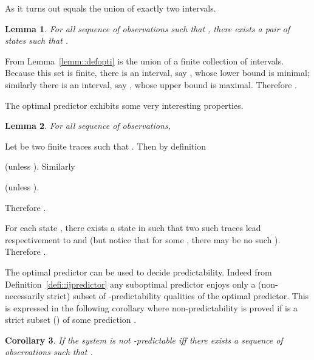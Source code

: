 \documentclass{article}
\newtheorem{lemm}{Lemma}
\newtheorem{coro}[lemm]{Corollary}
\newenvironment{proof}{\par\noindent{\bf Proof}}{\hspace{\stretch{1}}}
\begin{document}
As it turns out  equals the union of exactly two intervals.  

\begin{lemm}\label{lemm::twostates}
  For all sequence  of observations 
  such that , 
  there exists a pair of states  
  such that .  
\end{lemm}

\begin{proof}
  From Lemma~\ref{lemm::defopti} 
   is the union of a finite collection of intervals.  
  Because this set is finite, there is an interval, say , 
  whose lower bound is minimal; 
  similarly there is an interval, say , 
  whose upper bound is maximal.  
  Therefore .  
\end{proof}

The optimal predictor exhibits some very interesting properties.  

\begin{lemm}\label{lemm::onemoreobs}
  For all sequence  of observations, 
  
\end{lemm}

\begin{proof}
  Let  be two finite traces 
  such that .  
  Then by definition 
   
  (unless ).  
  Similarly 
   
  (unless ).  
  
  Therefore .  

  For each state , 
  there exists a state in  
  such that two such traces  
  lead respectivement to  and  
  (but notice that for some , there may be no such ).  
  Therefore .  
\end{proof}


The optimal predictor can be used to decide predictability.  
Indeed from Definition~\ref{defi::ijpredictor} 
any suboptimal predictor enjoys only a (non-necessarily strict) subset 
of -predictability qualities of the optimal predictor.  
This is expressed in the following corollary 
where non-predictability is proved 
if  is a strict subset () 
of some prediction .  

\begin{coro}\label{coro::predictfromoptimal}
  If  
  the system is not -predictable 
  iff there exists a sequence  of observations 
  such that .  
\end{coro}
\end{document}
